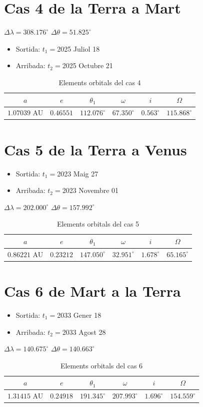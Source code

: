 \section{Cas 4 de la Terra a Mart}
$\Delta\lambda=308.176^{\circ}$
$\Delta\theta=51.825^{\circ}$
\begin{itemize}
	\item Sortida: $t_{1}=$2025 Juliol 18
	\item Arribada: $t_{2}=$2025 Octubre 21
\end{itemize}
\begin{table}[h!]
	\centering
	\begin{tabular}{ |c|c|c|c|c|c|}
		\hline
		$a$ & $e$ & $\theta_{1}$ & $\omega$ & $i$ & $\Omega$ \\ \hline
		$1.07039$ AU  & $0.46551$ & $112.076^{\circ}$ & $67.350^{\circ}$ & $0.563^{\circ}$ & $115.868^{\circ}$ \\ \hline
	\end{tabular}
	\caption{Elements orbitals del cas 4}
\end{table}

\section{Cas 5 de la Terra a Venus}
\begin{itemize}
	\item Sortida: $t_{1}=$2023 Maig 27
	\item Arribada: $t_{2}=$2023 Novembre 01
\end{itemize}
$\Delta\lambda=202.000^{\circ}$
$\Delta\theta=157.992^{\circ}$
\begin{table}[h!]
	\centering
	\begin{tabular}{ |c|c|c|c|c|c|}
		\hline
		$a$ & $e$ & $\theta_{1}$ & $\omega$ & $i$ & $\Omega$ \\ \hline
		$0.86221$ AU  & $0.23212$ & $147.050^{\circ}$ & $32.951^{\circ}$ & $1.678^{\circ}$ & $65.165^{\circ}$ \\ \hline
	\end{tabular}
	\caption{Elements orbitals del cas 5}
\end{table}

\section{Cas 6 de Mart a la Terra}
\begin{itemize}
	\item Sortida: $t_{1}=$2033 Gener 18
	\item Arribada: $t_{2}=$2033 Agost 28
\end{itemize}
$\Delta\lambda=140.675^{\circ}$
$\Delta\theta=140.663^{\circ}$
\begin{table}[h!]
	\centering
	\begin{tabular}{ |c|c|c|c|c|c|}
		\hline
		$a$ & $e$ & $\theta_{1}$ & $\omega$ & $i$ & $\Omega$ \\ \hline
		$1.31415$ AU  & $0.24918$ & $191.345^{\circ}$ & $207.993^{\circ}$ & $1.696^{\circ}$ & $154.559^{\circ}$ \\ \hline
	\end{tabular}
	\caption{Elements orbitals del cas 6}
\end{table}


